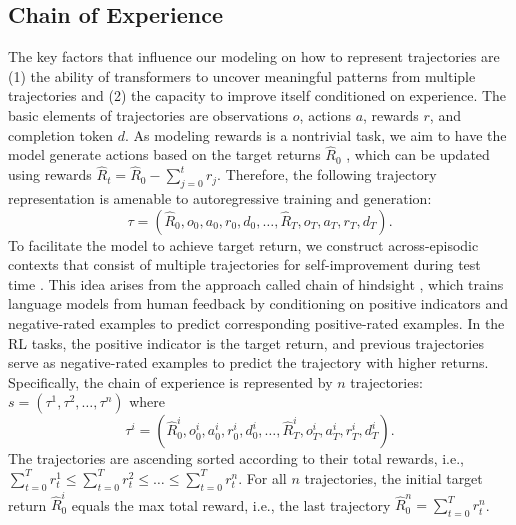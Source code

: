 \documentclass{article}
\theoremstyle{plain}
\theoremstyle{definition}
\theoremstyle{remark}
\begin{document}
\subsection{Chain of Experience}
The key factors that influence our modeling on how to represent trajectories are (1) the ability of transformers to uncover meaningful patterns from multiple trajectories and (2) the capacity to improve itself conditioned on experience. The basic elements of trajectories are observations $o$, actions $a$, rewards $r$, and completion token $d$. As modeling rewards is a nontrivial task, we aim to have the model generate actions based on the target returns $\hat{R}_0$ \cite{2}, which can be updated using rewards $\hat{R}_t=\hat{R}_0-\sum_{j=0}^tr_j$. Therefore, the following trajectory representation is amenable to autoregressive training and generation:
\begin{equation}
    \tau = (\hat{R}_0,o_0,a_0,r_0,d_0,\dots,\hat{R}_T,o_T,a_T,r_T,d_T).
\end{equation}
To facilitate the model to achieve target return, we construct across-episodic contexts that consist of multiple trajectories for self-improvement during test time \cite{1}. This idea arises from the approach called chain of hindsight \cite{24}, which trains language models from human feedback by conditioning on positive indicators and negative-rated examples to predict corresponding positive-rated examples. In the RL tasks, the positive indicator is the target return, and previous trajectories serve as negative-rated examples to predict the trajectory with higher returns.
Specifically, the chain of experience is represented by $n$ trajectories: $s=(\tau^{1},\tau^{2},\dots,\tau^{n})$ where
\begin{equation}
    \tau^{i}= (\hat{R}_0^i,o_0^i,a_0^i,r_0^i,d_0^i,\dots,\hat{R}_T^i,o_T^i,a_T^i,r_T^i,d_T^i).
\label{coe}
\end{equation}
The trajectories are ascending sorted according to their total rewards, i.e., $\sum_{t=0}^T{r_t^1}\leq\sum_{t=0}^T{r_t^2}\leq\dots\leq\sum_{t=0}^T{r_t^n}$. For all $n$ trajectories, the initial target return $\hat{R}_0^i$ equals the max total reward, i.e., the last trajectory $\hat{R}_0^n=\sum_{t=0}^T{r_t^n}$.
\end{document}
